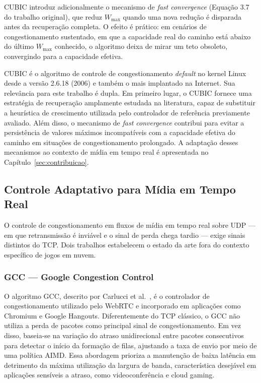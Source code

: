 \documentclass[conference]{IEEEtran}
\begin{document}
CUBIC introduz adicionalmente o mecanismo de \emph{fast
convergence} (Equação 3.7 do trabalho original), que reduz
$W_{\max}$ quando uma nova redução é disparada antes da
recuperação completa. O efeito é prático: em cenários de
congestionamento sustentado, em que a capacidade real do
caminho está abaixo do último $W_{\max}$ conhecido, o algoritmo
deixa de mirar um teto obsoleto, convergindo para a capacidade
efetiva.

CUBIC é o algoritmo de controle de congestionamento \emph{default}
no kernel Linux desde a versão 2.6.18 (2006) e também o
mais implantado na Internet. Sua relevância para este trabalho é dupla. Em primeiro lugar,
o CUBIC fornece uma estratégia de recuperação amplamente estudada
na literatura, capaz de substituir a heurística de crescimento
utilizada pelo controlador de referência previamente avaliado.
Além disso, o mecanismo de \emph{fast convergence} contribui para
evitar a persistência de valores máximos incompatíveis com a
capacidade efetiva do caminho em situações de congestionamento
prolongado. A adaptação desses mecanismos ao contexto de mídia em
tempo real é apresentada no Capítulo~\ref{sec:contribuicao}.

\subsection{Controle Adaptativo para Mídia em Tempo Real}

O controle de congestionamento em fluxos de mídia em tempo real
sobre UDP — em que retransmissão é inviável e o sinal de perda
chega tardio — exige sinais distintos do TCP. Dois trabalhos
estabelecem o estado da arte fora do contexto específico de
jogos em nuvem.

\subsubsection{GCC --- Google Congestion Control}

O algoritmo GCC, descrito por Carlucci et al.~\cite{gcc}, é o controlador de congestionamento utilizado pelo WebRTC e incorporado em aplicações como Chromium e Google Hangouts. Diferentemente do TCP clássico, o GCC não utiliza a perda de pacotes como principal sinal de congestionamento. Em vez disso, baseia-se na variação do atraso unidirecional entre pacotes consecutivos para detectar o início da formação de filas, ajustando a taxa de envio por meio de uma política AIMD. Essa abordagem prioriza a manutenção de baixa latência em detrimento da máxima utilização da largura de banda, característica desejável em aplicações sensíveis a atraso, como videoconferência e cloud gaming.
\end{document}
